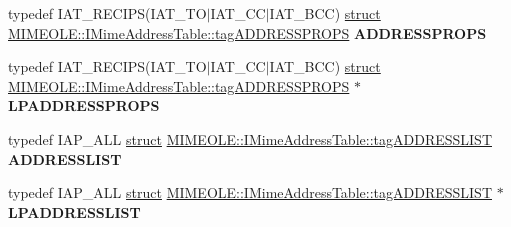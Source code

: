 \begin{DoxyCompactItemize}
typedef I\+A\+T\+\_\+\+R\+E\+C\+I\+PS(I\+A\+T\+\_\+\+TO$\vert$I\+A\+T\+\_\+\+CC$\vert$I\+A\+T\+\_\+\+B\+CC) \hyperlink{interfacestruct}{struct} \hyperlink{struct_m_i_m_e_o_l_e_1_1_i_mime_address_table_1_1tag_a_d_d_r_e_s_s_p_r_o_p_s}{M\+I\+M\+E\+O\+L\+E\+::\+I\+Mime\+Address\+Table\+::tag\+A\+D\+D\+R\+E\+S\+S\+P\+R\+O\+PS} {\bfseries A\+D\+D\+R\+E\+S\+S\+P\+R\+O\+PS}
\item 
\mbox{\label{interface_m_i_m_e_o_l_e_1_1_i_mime_address_table_adc8f9ee9c7d00ee17a56c7cfc50472f7}} 
typedef I\+A\+T\+\_\+\+R\+E\+C\+I\+PS(I\+A\+T\+\_\+\+TO$\vert$I\+A\+T\+\_\+\+CC$\vert$I\+A\+T\+\_\+\+B\+CC) \hyperlink{interfacestruct}{struct} \hyperlink{struct_m_i_m_e_o_l_e_1_1_i_mime_address_table_1_1tag_a_d_d_r_e_s_s_p_r_o_p_s}{M\+I\+M\+E\+O\+L\+E\+::\+I\+Mime\+Address\+Table\+::tag\+A\+D\+D\+R\+E\+S\+S\+P\+R\+O\+PS} $\ast$ {\bfseries L\+P\+A\+D\+D\+R\+E\+S\+S\+P\+R\+O\+PS}
\item 
\mbox{\label{interface_m_i_m_e_o_l_e_1_1_i_mime_address_table_a9263d3b155db178b14cf5bd23e74bea1}} 
typedef I\+A\+P\+\_\+\+A\+LL \hyperlink{interfacestruct}{struct} \hyperlink{struct_m_i_m_e_o_l_e_1_1_i_mime_address_table_1_1tag_a_d_d_r_e_s_s_l_i_s_t}{M\+I\+M\+E\+O\+L\+E\+::\+I\+Mime\+Address\+Table\+::tag\+A\+D\+D\+R\+E\+S\+S\+L\+I\+ST} {\bfseries A\+D\+D\+R\+E\+S\+S\+L\+I\+ST}
\item 
\mbox{\label{interface_m_i_m_e_o_l_e_1_1_i_mime_address_table_a14af59d5051e337a3e9a264adce8298a}} 
typedef I\+A\+P\+\_\+\+A\+LL \hyperlink{interfacestruct}{struct} \hyperlink{struct_m_i_m_e_o_l_e_1_1_i_mime_address_table_1_1tag_a_d_d_r_e_s_s_l_i_s_t}{M\+I\+M\+E\+O\+L\+E\+::\+I\+Mime\+Address\+Table\+::tag\+A\+D\+D\+R\+E\+S\+S\+L\+I\+ST} $\ast$ {\bfseries L\+P\+A\+D\+D\+R\+E\+S\+S\+L\+I\+ST}
\end{DoxyCompactItemize}
